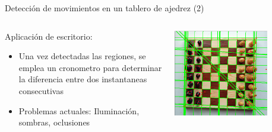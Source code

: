 \begin{frame}{Detección de movimientos en un tablero de ajedrez (2)}
\begin{columns}
\begin{column}{0.38\textwidth}
Aplicación de escritorio:
	\begin{itemize}
\item Una vez detectadas las regiones, se emplea un cronometro para determinar la diferencia entre dos instantaneas consecutivas
\item Problemas actuales: Iluminación, sombras, oclusiones
	\end{itemize}
\end{column}
\begin{column}{0.28\textwidth}
\begin{center}
     \includegraphics[width=0.79\textwidth]{Figs/AjedrezFroylan3}\\
     \end{center}
\end{column}
\begin{column}{0.28\textwidth}
\begin{center}

\end{center}
\end{column}
\end{columns}
\end{frame}
